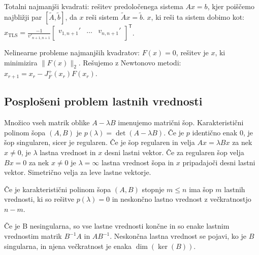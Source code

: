\documentclass[a4paper,10pt]{article}
\theoremstyle{definition}
\newcommand{\T}{\mathsf{T}\!}
\begin{document}
Totalni najmanjši kvadrati:
rešitev predoločenega sistema $Ax = b$, kjer poiščemo najbližji par $[\tilde{A},
\tilde{b}]$, da $x$ reši sistem $\tilde{A}x = \tilde{b}$.
$x$, ki reši ta sistem dobimo kot:
$x_{\text{TLS}} = \frac{-1}{v'_{n+1,n+1}}
  \begin{bmatrix}
    v_{1,n+1}' & \dots & v_{n,n+1}' \\
  \end{bmatrix}^\T$.

Nelinearne probleme najmanjših kvadratov: $F(x) = 0$, rešitev je $x$, ki
minimizira $\|F(x)\|_2$. Rešujemo z Newtonovo metodi:
$x_{r+1} = x_r - J_F^+(x_r)F(x_r)$.

\subsection*{Posplošeni problem lastnih vrednosti}

Množico vseh matrik oblike $A-\lambda B$ imenujemo matrični šop. Karakteristični
polinom šopa $(A,B)$ je $p(\lambda)=\det (A-\lambda B)$. Če je $p$ identično
enak $0$, je šop singularen, sicer je regularen.
Če je šop regularen in velja $Ax = \lambda Bx$  za nek $x\not=0$, je $\lambda$
lastna vrednost in $x$ desni lastni vektor. Če za regularen šop velja $Bx=0$ za
nek $x\not=0$ je $\lambda=\infty$ lastna vrednost šopa in $x$ pripadajoči desni
lastni vektor.
Simetrično velja za leve lastne vektorje.

Če je karakteristični polinom šopa $(A, B)$ stopnje $m\leq n$ ima šop $m$ lastnih
vrednosti, ki so rešitve $p(\lambda)=0$ in neskončno lastno vrednost z
večkratnostjo $n-m$.

Če je B nesingularna, so vse lastne vrednosti končne in so enake lastnim
vrednostim matrik $B^{-1}A$ in $AB^{-1}$. Neskončna lastna vrednost se pojavi,
ko je $B$ singularna, in njena večkratnost je enaka $\dim(\ker(B))$.
\end{document}
